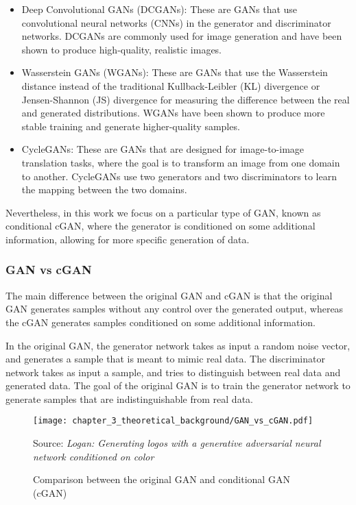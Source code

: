 \begin{itemize}
	\item Deep Convolutional GANs (DCGANs): These are GANs that use convolutional neural networks (CNNs) in the generator and discriminator networks. DCGANs are commonly used for image generation and have been shown to produce high-quality, realistic images.
	\item Wasserstein GANs (WGANs): These are GANs that use the Wasserstein distance instead of the traditional Kullback-Leibler (KL) divergence or Jensen-Shannon (JS) divergence for measuring the difference between the real and generated distributions. WGANs have been shown to produce more stable training and generate higher-quality samples.
	\item CycleGANs: These are GANs that are designed for image-to-image translation tasks, where the goal is to transform an image from one domain to another. CycleGANs use two generators and two discriminators to learn the mapping between the two domains.
\end{itemize}

Nevertheless, in this work we focus on a particular type of GAN, known as conditional \ac{cGAN}, where the generator is conditioned on some additional information, allowing for more specific generation of data. 

\subsubsection{GAN vs cGAN}
\label{subsubsec:3_cGAN}

The main difference between the original GAN and cGAN is that the original GAN generates samples without any control over the generated output, whereas the cGAN generates samples conditioned on some additional information.

In the original GAN, the generator network takes as input a random noise vector, and generates a sample that is meant to mimic real data. The discriminator network takes as input a sample, and tries to distinguish between real data and generated data. The goal of the original GAN is to train the generator network to generate samples that are indistinguishable from real data.

\begin{figure}[h]
	\centering
	\texttt{[image: chapter\_3\_theoretical\_background/GAN\_vs\_cGAN.pdf]}
	\caption{Comparison between the original GAN and conditional GAN (cGAN)}
	Source: \textit{Logan: Generating logos with a generative adversarial neural network conditioned on color} \cite{mino2018logan}
	\label{fig:chapter_3_theoretical_background/GAN_vs_cGAN}
\end{figure}

